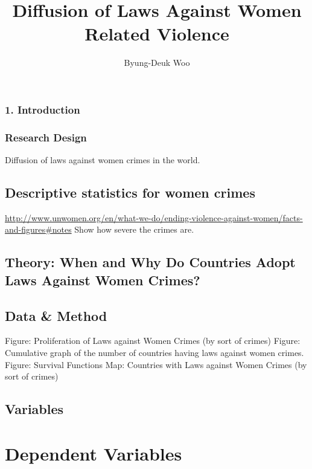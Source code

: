 \documentclass[]{article}
\title{Diffusion of Laws Against Women Related Violence}
\author{Byung-Deuk Woo}
\date{}
\begin{document}
\maketitle

\subsubsection{1. Introduction}\label{introduction}

\subsubsection{Research Design}\label{research-design}

Diffusion of laws against women crimes in the world.

\subsection{Descriptive statistics for women
crimes}\label{descriptive-statistics-for-women-crimes}

\url{http://www.unwomen.org/en/what-we-do/ending-violence-against-women/facts-and-figures\#notes}
Show how severe the crimes are.

\subsection{Theory: When and Why Do Countries Adopt Laws Against Women
Crimes?}\label{theory-when-and-why-do-countries-adopt-laws-against-women-crimes}

\subsection{Data \& Method}\label{data-method}

Figure: Proliferation of Laws against Women Crimes (by sort of crimes)
Figure: Cumulative graph of the number of countries having laws against
women crimes. Figure: Survival Functions Map: Countries with Laws
against Women Crimes (by sort of crimes)

\subsection{Variables}\label{variables}

\section{Dependent Variables}\label{dependent-variables}
\end{document}
